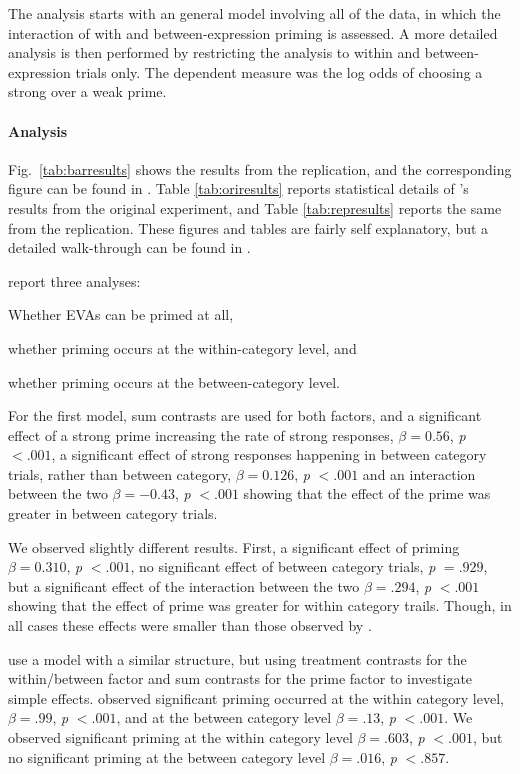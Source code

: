 \documentclass[10pt]{article}
\begin{document}
\begin{multicols}{2}
The analysis starts with an general model involving all of the data, in which the interaction of with and between-expression priming is assessed.
A more detailed analysis is then performed by restricting the analysis to within and between-expression trials only.
The dependent measure was the log odds of choosing a strong over a weak prime.

\paragraph{Analysis}

Fig.\ \ref{tab:barresults} shows the results from the replication, and the corresponding figure can be found in \textcite[122]{Bott:2016aa}.
Table \ref{tab:oriresults} reports statistical details of \citeauthor{Bott:2016aa}'s results from the original experiment, and Table \ref{tab:represults} reports the same from the replication.
These figures and tables are fairly self explanatory, but a detailed walk-through can be found in \textcite[125]{Bott:2016aa}.

\citeauthor{Bott:2016aa} report three analyses:
\begin{enumerate*}
\item Whether EVAs can be primed at all,
\item whether priming occurs at the within-category level, and
\item whether priming occurs at the between-category level.
\end{enumerate*}
For the first model, sum contrasts are used for both factors, and a significant effect of a strong prime increasing the rate of strong responses, \(\beta = 0.56\), \emph{p} \(< .001\), a significant effect of strong responses happening in between category trials, rather than between category, \(\beta = 0.126\), \emph{p} \(< .001\) and an interaction between the two \(\beta = -0.43\), \emph{p} \(< .001\) showing that the effect of the prime was greater in between category trials.

We observed slightly different results.
First, a significant effect of priming \(\beta = 0.310\), \emph{p} \(<.001\), no significant effect of between category trials, \emph{p} \(= .929\), but a significant effect of the interaction between the two \(\beta = .294\), \emph{p} \(<.001\) showing that the effect of prime was greater for within category trails.
Though, in all cases these effects were smaller than those observed by \citeauthor{Bott:2016aa}.

\citeauthor{Bott:2016aa} use a model with a similar structure, but using treatment contrasts for the within/between factor and sum contrasts for the prime factor to investigate simple effects.
\citeauthor{Bott:2016aa} observed significant priming occurred at the within category level, \(\beta = .99\), \emph{p} \(< .001\), and at the between category level \(\beta = .13\), \emph{p} \(< .001\).
We observed significant priming at the within category level \(\beta = .603\), \emph{p} \(<.001\), but no significant priming at the between category level \(\beta = .016\), \emph{p} \(< .857\).


\end{multicols}
\end{document}
